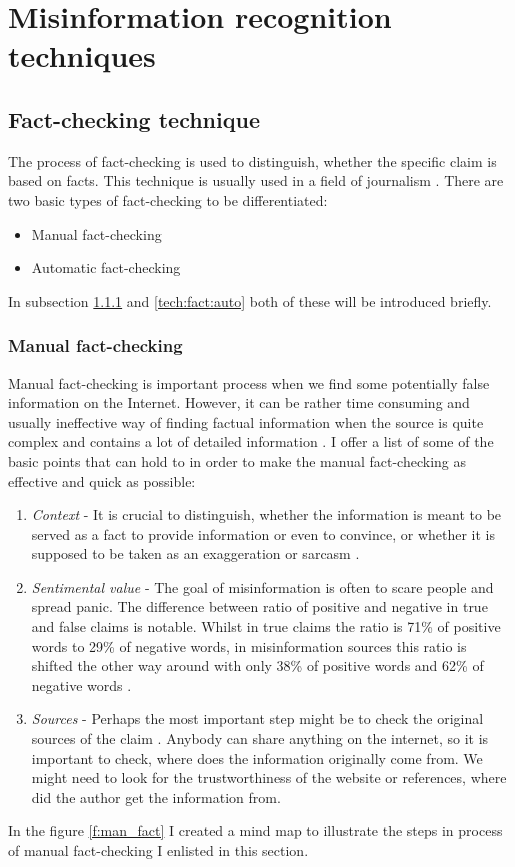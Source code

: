 \documentclass[11pt ,english,a4paper]{article}
\begin{document}
\section{Misinformation recognition techniques} \label{tech}

\subsection{Fact-checking technique} \label{tech:fact}
The process of fact-checking is used to distinguish, whether the specific claim is based on facts. This technique is usually used in a field of journalism \cite{alh18fact}.
There are two basic types of fact-checking to be differentiated:\cite{vla14fact} 
\begin{itemize}
\item Manual fact-checking
\item Automatic fact-checking
\end{itemize}
In subsection \ref{tech:fact:man} and \ref{tech:fact:auto} both of these will be introduced briefly.

\subsubsection{Manual fact-checking}\label{tech:fact:man}
Manual fact-checking is important process when we find some potentially false information on the Internet. However, it can be rather time consuming and usually ineffective way of finding factual information when the source is quite complex and contains a lot of detailed information \cite{gu22fact}. I offer a list of some of the basic points that can hold to in order to make the manual fact-checking as effective and quick as possible:
\begin{enumerate}
\item{\emph{Context}} - It is crucial to distinguish, whether the information is meant to be served as a fact to provide information or even to convince, or whether it is supposed to be taken as an exaggeration or sarcasm \cite{alh18fact}.
\item {\emph{Sentimental value}} - The goal of misinformation is often to scare people and spread panic. The difference between ratio of positive and negative in true and false claims is notable. Whilst in true claims the ratio is 71\% of positive words to 29\% of negative words, in misinformation sources this ratio is shifted the other way around with only 38\% of positive words and 62\% of negative words \cite{bar21health}.
\item {\emph{Sources}} - Perhaps the most important step might be to check the original sources of the claim \cite{gra17fact}. Anybody can share anything on the internet, so it is important to check, where does the information originally come from. We might need to look for the trustworthiness of the website or references, where did the author get the information from.
\end{enumerate}
In the figure \ref{f:man_fact} I created a mind map to illustrate the steps in process of manual fact-checking I enlisted in this section.
\end{document}

